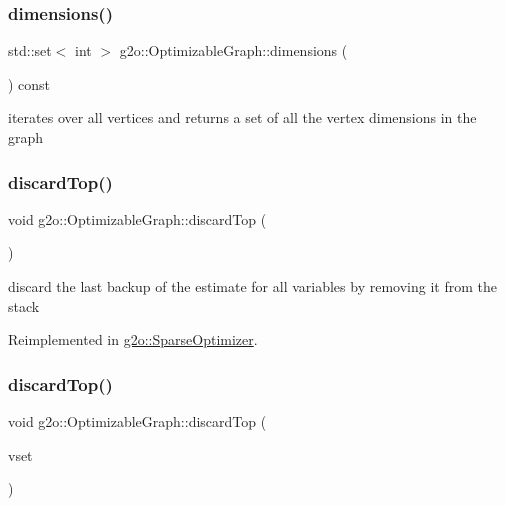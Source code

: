 \subsubsection{\texorpdfstring{dimensions()}{dimensions()}}
{\footnotesize\ttfamily std\+::set$<$ int $>$ g2o\+::\+Optimizable\+Graph\+::dimensions (\begin{DoxyParamCaption}{ }\end{DoxyParamCaption}) const}

iterates over all vertices and returns a set of all the vertex dimensions in the graph \mbox{\label{structg2o_1_1_optimizable_graph_a368b5f22dbc57abd2f651a20d039f61c}} 
\subsubsection{\texorpdfstring{discard\+Top()}{discardTop()}\hspace{0.1cm}{\footnotesize\ttfamily [1/2]}}
{\footnotesize\ttfamily void g2o\+::\+Optimizable\+Graph\+::discard\+Top (\begin{DoxyParamCaption}{ }\end{DoxyParamCaption})\hspace{0.3cm}{\ttfamily [virtual]}}



discard the last backup of the estimate for all variables by removing it from the stack 



Reimplemented in \mbox{\hyperlink{classg2o_1_1_sparse_optimizer_a20ed9e9f1201bfb874456a8d30f169fb}{g2o\+::\+Sparse\+Optimizer}}.

\mbox{\label{structg2o_1_1_optimizable_graph_a74cbd91a3e05c1f497b4675b0e70113a}} 
\subsubsection{\texorpdfstring{discard\+Top()}{discardTop()}\hspace{0.1cm}{\footnotesize\ttfamily [2/2]}}
{\footnotesize\ttfamily void g2o\+::\+Optimizable\+Graph\+::discard\+Top (\begin{DoxyParamCaption}\item[{\mbox{\hyperlink{classg2o_1_1_hyper_graph_a703938cdb4bb636860eed55a2489d70c}{Hyper\+Graph\+::\+Vertex\+Set}} \&}]{vset }\end{DoxyParamCaption})\hspace{0.3cm}{\ttfamily [virtual]}}



